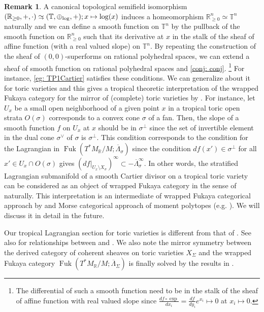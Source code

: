 \documentclass[a4paper,dvipdfmx,reqno,12pt]{amsart}
\theoremstyle{definition}
\newtheorem{remark}[theorem]{Remark}
\newcommand{\mb}[1]{\mathbb{#1}}%
\newcommand{\opn}[1]{\operatorname{#1}}
\newcommand{\myfootnote}[1]{\hspace{-5pt}\footnote{#1}}
\newcommand{\simto}{ 
\mathrel{\raisebox{0.13em}{${\sim}$}}
\kern -0.75em \mathrel{\raisebox{-0.11em}{${\scriptstyle \to}$}}  
}
\numberwithin{equation}{section}
\begin{document}
\begin{remark}
A canonical topological semifield isomorphism 
$({\mathbb{R}}_{\geq 0},+,\cdot)\simto 
(\mb{T},\oplus_{\opn{log}},+);x\mapsto \log(x)$
induces a homeomorphism ${\mathbb{R}}_{\geq 0}^{n}\simeq \mb{T}^{n}$
naturally and we can define a smooth function on 
$\mb{T}^{n}$ by the pullback of the smooth function on 
${\mathbb{R}}_{\geq 0}^{n}$ such that its derivative at $x$ in
the stalk of the sheaf of affine function
(with a real valued slope) on $\mb{T}^{n}$.
 By repeating
the construction of the sheaf of $(0,0)$-superforms on 
rational polyhedral spaces, we can extend a sheaf of
smooth function on rational polyhedral spaces and
\cref{conj: conj}.
\myfootnote{The differential of such a smooth function 
need to be in the stalk of the sheaf of affine function 
with real valued slope since 
$\frac{df\circ \opn{exp}}{dx_i}=
\frac{df}{dy_i}e^{x_i}\mapsto 0$ at 
$x_i\mapsto 0$.}
 For instance, \cref{eg: TP1Cartier} satisfies 
these conditions. We can generalize about it for toric
varieties and this gives a tropical theoretic interpretation 
of the wrapped Fukaya category for the mirror of
(complete) toric varieties by \cite{MR2871160}.
For instance, let $U_{x}$ be a small open neighborhood of 
a given point $x$ in a tropical toric open strata $O(\sigma)$
 corresponds to a convex cone $\sigma$ of a fan.
Then, the slope of a smooth function $f$ on $U_{x}$ at $x$
should be in $\sigma^{\bot}$ since the set of 
invertible element
in the dual cone $\sigma^{\vee}$ of $\sigma$ is $\sigma^{\bot}$.
This condition corresponds to the condition for the Lagrangian
in $\opn{Fuk}(T^{*}M_{{\mathbb{R}}}/M;\overline{\Lambda}_{\sigma})$ 
\cite[3.1]{MR2871160} since
the condition $df(x')\in\sigma^{\bot}$ for all 
$x'\in U_x\cap O(\sigma)$ gives 
$(df|_{U_{x}\setminus X_{\sigma}})^{\infty}\subset 
-\overline{\Lambda}_{\sigma}^{\infty}$.
In other words, the stratified Lagrangian submanifold 
of a smooth Cartier divisor on a tropical toric variety
can be considered as 
an object of wrapped Fukaya category in the sense of
\cite{MR2871160} naturally. This interpretation is 
an intermediate of wrapped Fukaya categorical approach by
\cite{MR2871160}
and Morse categorical approach of moment polytopes
(e.g. \cite{MR4234675}).
We will discuss it in detail in the future.

Our tropical Lagrangian section for toric varieties is 
different from that of \cite{MR2240909,MR2529936}.
See also \cite[Appendix C.2.]{MR2871160} for relationships
between \cite{MR2871160} and \cite{MR2240909,MR2529936}.
We also note the mirror symmetry between the derived category of
coherent sheaves on toric varieties $X_{\Sigma}$ and
the wrapped Fukaya category 
$\opn{Fuk}(T^{*}M_{{\mathbb{R}}}/M;\overline{\Lambda}_{\Sigma})$
is finally solved by the results in \cite{MR4132582}.
\end{remark}
\end{document}
